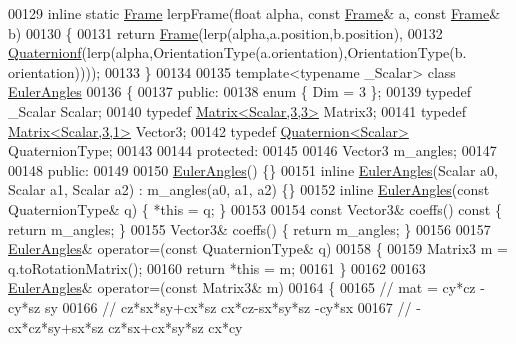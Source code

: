 \begin{DoxyCode}
00129 \textcolor{keyword}{inline} \textcolor{keyword}{static} \hyperlink{class_frame}{Frame} lerpFrame(\textcolor{keywordtype}{float} alpha, \textcolor{keyword}{const} \hyperlink{class_frame}{Frame}& a, \textcolor{keyword}{const} \hyperlink{class_frame}{Frame}& b)
00130 \{
00131   \textcolor{keywordflow}{return} \hyperlink{class_frame}{Frame}(lerp(alpha,a.position,b.position),
00132                \hyperlink{group___geometry___module_class_eigen_1_1_quaternion}{Quaternionf}(lerp(alpha,OrientationType(a.orientation),OrientationType(b.
      orientation))));
00133 \}
00134 
00135 \textcolor{keyword}{template}<\textcolor{keyword}{typename} \_Scalar> \textcolor{keyword}{class }\hyperlink{class_eigen_1_1_euler_angles}{EulerAngles}
00136 \{
00137 \textcolor{keyword}{public}:
00138   \textcolor{keyword}{enum} \{ Dim = 3 \};
00139   \textcolor{keyword}{typedef} \_Scalar Scalar;
00140   \textcolor{keyword}{typedef} \hyperlink{group___core___module_class_eigen_1_1_matrix}{Matrix<Scalar,3,3>} Matrix3;
00141   \textcolor{keyword}{typedef} \hyperlink{group___core___module}{Matrix<Scalar,3,1>} Vector3;
00142   \textcolor{keyword}{typedef} \hyperlink{group___geometry___module_class_eigen_1_1_quaternion}{Quaternion<Scalar>} QuaternionType;
00143 
00144 \textcolor{keyword}{protected}:
00145 
00146   Vector3 m\_angles;
00147 
00148 \textcolor{keyword}{public}:
00149 
00150   \hyperlink{class_eigen_1_1_euler_angles}{EulerAngles}() \{\}
00151   \textcolor{keyword}{inline} \hyperlink{class_eigen_1_1_euler_angles}{EulerAngles}(Scalar a0, Scalar a1, Scalar a2) : m\_angles(a0, a1, a2) \{\}
00152   \textcolor{keyword}{inline} \hyperlink{class_eigen_1_1_euler_angles}{EulerAngles}(\textcolor{keyword}{const} QuaternionType& q) \{ *\textcolor{keyword}{this} = q; \}
00153 
00154   \textcolor{keyword}{const} Vector3& coeffs()\textcolor{keyword}{ const }\{ \textcolor{keywordflow}{return} m\_angles; \}
00155   Vector3& coeffs() \{ \textcolor{keywordflow}{return} m\_angles; \}
00156 
00157   \hyperlink{class_eigen_1_1_euler_angles}{EulerAngles}& operator=(\textcolor{keyword}{const} QuaternionType& q)
00158   \{
00159     Matrix3 m = q.toRotationMatrix();
00160     \textcolor{keywordflow}{return} *\textcolor{keyword}{this} = m;
00161   \}
00162 
00163   \hyperlink{class_eigen_1_1_euler_angles}{EulerAngles}& operator=(\textcolor{keyword}{const} Matrix3& m)
00164   \{
00165     \textcolor{comment}{// mat =  cy*cz          -cy*sz           sy}
00166     \textcolor{comment}{//        cz*sx*sy+cx*sz  cx*cz-sx*sy*sz -cy*sx}
00167     \textcolor{comment}{//       -cx*cz*sy+sx*sz  cz*sx+cx*sy*sz  cx*cy}

\end{DoxyCode}
